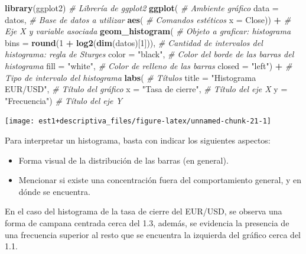 \documentclass[
  11pt,
]{book}
\newenvironment{Shaded}{\begin{snugshade}}{\end{snugshade}}
\newcommand{\AttributeTok}[1]{\textcolor[rgb]{0.13,0.29,0.53}{#1}}
\newcommand{\CommentTok}[1]{\textcolor[rgb]{0.56,0.35,0.01}{\textit{#1}}}
\newcommand{\DecValTok}[1]{\textcolor[rgb]{0.00,0.00,0.81}{#1}}
\newcommand{\FunctionTok}[1]{\textcolor[rgb]{0.13,0.29,0.53}{\textbf{#1}}}
\newcommand{\NormalTok}[1]{#1}
\newcommand{\SpecialCharTok}[1]{\textcolor[rgb]{0.81,0.36,0.00}{\textbf{#1}}}
\newcommand{\StringTok}[1]{\textcolor[rgb]{0.31,0.60,0.02}{#1}}
\providecommand{\tightlist}{%
  \setlength{\itemsep}{0pt}\setlength{\parskip}{0pt}}
\theoremstyle{definition}
\theoremstyle{definition}
\theoremstyle{definition}
\theoremstyle{definition}
\theoremstyle{remark}
\begin{document}
\begin{Shaded}
\begin{Highlighting}[]
\FunctionTok{library}\NormalTok{(ggplot2) }\CommentTok{\# Librería de ggplot2}
\FunctionTok{ggplot}\NormalTok{( }\CommentTok{\# Ambiente gráfico}
  \AttributeTok{data =}\NormalTok{ datos, }\CommentTok{\# Base de datos a utilizar}
       \FunctionTok{aes}\NormalTok{( }\CommentTok{\# Comandos estéticos}
         \AttributeTok{x =}\NormalTok{ Close)) }\SpecialCharTok{+} \CommentTok{\# Eje X y variable asociada }
  \FunctionTok{geom\_histogram}\NormalTok{( }\CommentTok{\# Objeto a graficar: histograma}
    \AttributeTok{bins =} \FunctionTok{round}\NormalTok{(}\DecValTok{1} \SpecialCharTok{+} \FunctionTok{log2}\NormalTok{(}\FunctionTok{dim}\NormalTok{(datos)[}\DecValTok{1}\NormalTok{])), }\CommentTok{\# Cantidad de intervalos del histograma: regla de Sturges}
    \AttributeTok{color =} \StringTok{"black"}\NormalTok{, }\CommentTok{\# Color del borde de las barras del histograma}
    \AttributeTok{fill =} \StringTok{"white"}\NormalTok{, }\CommentTok{\# Color de relleno de las barras}
    \AttributeTok{closed =} \StringTok{"left"}\NormalTok{) }\SpecialCharTok{+} \CommentTok{\# Tipo de intervalo del histograma}
  \FunctionTok{labs}\NormalTok{( }\CommentTok{\# Títulos}
    \AttributeTok{title =} \StringTok{"Histograma EUR/USD"}\NormalTok{, }\CommentTok{\# Título del gráfico}
    \AttributeTok{x =} \StringTok{"Tasa de cierre"}\NormalTok{, }\CommentTok{\# Título del eje X}
    \AttributeTok{y =} \StringTok{"Frecuencia"}\NormalTok{) }\CommentTok{\# Título del eje Y}
\end{Highlighting}
\end{Shaded}

\begin{center}\texttt{[image: est1+descriptiva\_files/figure-latex/unnamed-chunk-21-1]} \end{center}

Para interpretar un histograma, basta con indicar los siguientes aspectos:

\begin{itemize}
\tightlist
\item
  Forma visual de la distribución de las barras (en general).
\item
  Mencionar si existe una concentración fuera del comportamiento general, y en dónde se encuentra.
\end{itemize}

En el caso del histograma de la tasa de cierre del EUR/USD, se observa una forma de campana centrada cerca del 1.3, además, se evidencia la presencia de una frecuencia superior al resto que se encuentra la izquierda del gráfico cerca del 1.1.
\end{document}
